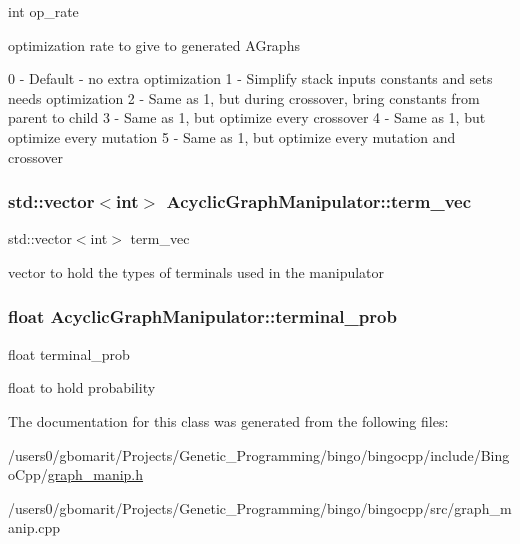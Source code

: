 int op\+\_\+rate 

optimization rate to give to generated A\+Graphs

0 -\/ Default -\/ no extra optimization 1 -\/ Simplify stack inputs constants and sets needs optimization 2 -\/ Same as 1, but during crossover, bring constants from parent to child 3 -\/ Same as 1, but optimize every crossover 4 -\/ Same as 1, but optimize every mutation 5 -\/ Same as 1, but optimize every mutation and crossover 
\subsubsection[{\texorpdfstring{term\+\_\+vec}{term_vec}}]{\setlength{\rightskip}{0pt plus 5cm}std\+::vector$<$int$>$ Acyclic\+Graph\+Manipulator\+::term\+\_\+vec}\hypertarget{classAcyclicGraphManipulator_a4eae07e6d85c11dd5c24e74beecb2682}{}\label{classAcyclicGraphManipulator_a4eae07e6d85c11dd5c24e74beecb2682}


std\+::vector$<$int$>$ term\+\_\+vec 

vector to hold the types of terminals used in the manipulator 
\subsubsection[{\texorpdfstring{terminal\+\_\+prob}{terminal_prob}}]{\setlength{\rightskip}{0pt plus 5cm}float Acyclic\+Graph\+Manipulator\+::terminal\+\_\+prob}\hypertarget{classAcyclicGraphManipulator_a0b11805aca890b75517094e6afd98875}{}\label{classAcyclicGraphManipulator_a0b11805aca890b75517094e6afd98875}


float terminal\+\_\+prob 

float to hold probability 

The documentation for this class was generated from the following files\+:\begin{DoxyCompactItemize}
\item 
/users0/gbomarit/\+Projects/\+Genetic\+\_\+\+Programming/bingo/bingocpp/include/\+Bingo\+Cpp/\hyperlink{graph__manip_8h}{graph\+\_\+manip.\+h}\item 
/users0/gbomarit/\+Projects/\+Genetic\+\_\+\+Programming/bingo/bingocpp/src/graph\+\_\+manip.\+cpp\end{DoxyCompactItemize}
